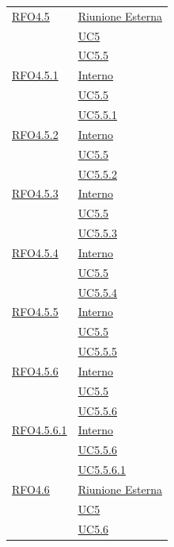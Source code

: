 \begin{longtable}{|>{\centering}m{5cm}|m{5cm}<{\centering}|}
\hyperlink{RFO4.5}{RFO4.5} & \hyperlink{Riunione Esterna}{Riunione Esterna}\\
& \hyperref[UC5]{UC5}\\
& \hyperref[UC5.5]{UC5.5}\\ \hline

\hyperlink{RFO4.5.1}{RFO4.5.1} & \hyperlink{Interno}{Interno}\\
& \hyperref[UC5.5]{UC5.5}\\
& \hyperref[UC5.5.1]{UC5.5.1}\\ \hline

\hyperlink{RFO4.5.2}{RFO4.5.2} & \hyperlink{Interno}{Interno}\\
& \hyperref[UC5.5]{UC5.5}\\
& \hyperref[UC5.5.2]{UC5.5.2}\\ \hline

\hyperlink{RFO4.5.3}{RFO4.5.3} & \hyperlink{Interno}{Interno}\\
& \hyperref[UC5.5]{UC5.5}\\
& \hyperref[UC5.5.3]{UC5.5.3}\\ \hline

\hyperlink{RFO4.5.4}{RFO4.5.4} & \hyperlink{Interno}{Interno}\\
& \hyperref[UC5.5]{UC5.5}\\
& \hyperref[UC5.5.4]{UC5.5.4}\\ \hline

\hyperlink{RFO4.5.5}{RFO4.5.5} & \hyperlink{Interno}{Interno}\\
& \hyperref[UC5.5]{UC5.5}\\
& \hyperref[UC5.5.5]{UC5.5.5}\\ \hline

\hyperlink{RFO4.5.6}{RFO4.5.6} & \hyperlink{Interno}{Interno}\\
& \hyperref[UC5.5]{UC5.5}\\
& \hyperref[UC5.5.6]{UC5.5.6}\\ \hline

\hyperlink{RFO4.5.6.1}{RFO4.5.6.1} & \hyperlink{Interno}{Interno}\\
& \hyperref[UC5.5.6]{UC5.5.6}\\
& \hyperref[UC5.5.6.1]{UC5.5.6.1}\\ \hline

\hyperlink{RFO4.6}{RFO4.6} & \hyperlink{Riunione Esterna}{Riunione Esterna}\\
& \hyperref[UC5]{UC5}\\
& \hyperref[UC5.6]{UC5.6}\\ \hline


\end{longtable}
